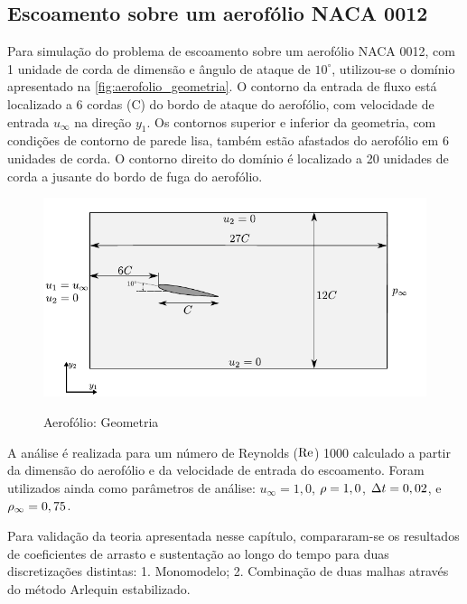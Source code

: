 \subsection{Escoamento sobre um aerofólio NACA 0012} \label{capitulo:Cap6:Exemplos:NACA0012}

Para simulação do problema de escoamento sobre um aerofólio NACA 0012, com 1 unidade de corda de dimensão e ângulo de ataque de $10^{\circ}$, utilizou-se o domínio apresentado na \autoref{fig:aerofolio_geometria}. O contorno da entrada de fluxo está localizado a 6 cordas (C) do bordo de ataque do aerofólio, com velocidade de entrada $u_{\infty}$ na direção $y_1$. Os contornos superior e inferior da geometria, com condições de contorno de parede lisa, também estão afastados do aerofólio em 6 unidades de corda. O contorno direito do domínio é localizado a 20 unidades de corda a jusante do bordo de fuga do aerofólio. 

\begin{figure}[!htbp]
	\caption{Aerofólio: Geometria}
	\centering 
	{\includegraphics[scale=1.0,trim=0cm 0cm 0cm 0cm, clip=true]{Imagens/Cap6/aerofolio_geometria.pdf}}	
	\label{fig:aerofolio_geometria}
\end{figure}

A análise é realizada para um número de Reynolds ($\mathrm{Re}$) 1000 calculado a partir da dimensão do aerofólio e da velocidade de entrada do escoamento. Foram utilizados ainda como parâmetros de análise: $u_{\infty} = 1,0$,  $\rho = 1,0$,  $\Delta t = 0,02$, e $\rho_\infty = 0,75$.

Para validação da teoria apresentada nesse capítulo, compararam-se os resultados de coeficientes de arrasto e sustentação ao longo do tempo para duas discretizações distintas: 1. Monomodelo; 2. Combinação de duas malhas através do método Arlequin estabilizado.

